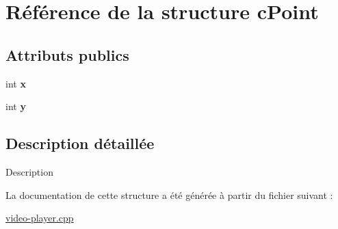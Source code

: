 \hypertarget{structcPoint}{}\section{Référence de la structure c\+Point}
\label{structcPoint}
\subsection*{Attributs publics}
\begin{DoxyCompactItemize}
\item 
\mbox{\label{structcPoint_af84bc54cbceedc4a2031f2adfb1fd024}} 
int {\bfseries x}
\item 
\mbox{\label{structcPoint_acd07ed6ddf416a392ee4bfe59e711ee7}} 
int {\bfseries y}
\end{DoxyCompactItemize}


\subsection{Description détaillée}
Description 

La documentation de cette structure a été générée à partir du fichier suivant \+:\begin{DoxyCompactItemize}
\item 
\hyperlink{video-player_8cpp}{video-\/player.\+cpp}\end{DoxyCompactItemize}

